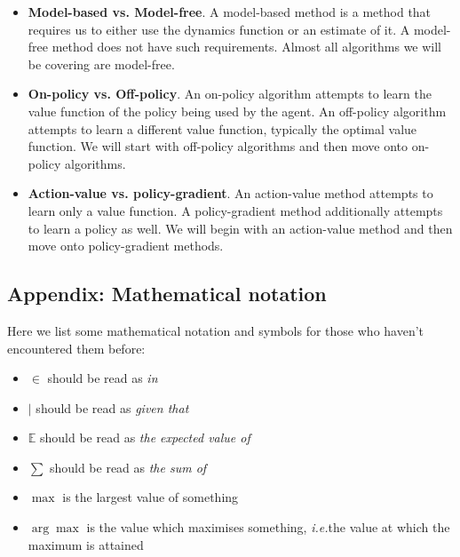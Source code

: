 \documentclass[]{article}
\newcommand{\E}{\mathbb{E}}
\newcommand{\ie}{\emph{i.e.}}
\begin{document}
\begin{itemize}
	\item \textbf{Model-based vs. Model-free}. A model-based method is a method that requires us to either use the dynamics function or an estimate of it. A model-free method does not have such requirements. Almost all algorithms we will be covering are model-free.
	\item \textbf{On-policy vs. Off-policy}. An on-policy algorithm attempts to learn the value function of the policy being used by the agent. An off-policy algorithm attempts to learn a different value function, typically the optimal value function. We will start with off-policy algorithms and then move onto on-policy algorithms.
	\item \textbf{Action-value vs. policy-gradient}. An action-value method attempts to learn only a value function. A policy-gradient method additionally attempts to learn a policy as well. We will begin with an action-value method and then move onto policy-gradient methods. 
\end{itemize}


\subsection*{Appendix: Mathematical notation}
Here we list some mathematical notation and symbols for those who haven't encountered them before:
\begin{itemize}
	\item $\in$ should be read as \emph{in}
	\item $|$ should be read as \emph{given that}
	\item $\E$ should be read as \emph{the expected value of}
	\item $\sum$ should be read as \emph{the sum of}
	\item $\max$ is the largest value of something
	\item $\arg\max$ is the value which maximises something, \ie the value at which the maximum is attained
\end{itemize}
\end{document}
